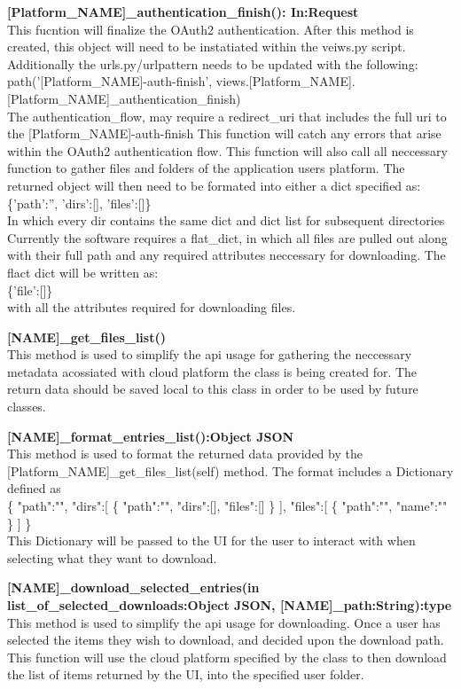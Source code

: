 \textbf{[Platform\_NAME]\_authentication\_finish(): In:Request} \\
This fucntion will finalize the OAuth2 authentication. After this method is created, this object will need to be instatiated
within the veiws.py script. Additionally the urls.py/urlpattern needs to be updated with the following: \\
  path('[Platform_NAME]-auth-finish', views.[Platform_NAME].[Platform_NAME]_authentication_finish) \\
The authentication_flow, may require a redirect_uri that includes the full uri to the [Platform_NAME]-auth-finish
This function will catch any errors that arise within the OAuth2 authentication flow. 
This function will also call all neccessary function to gather files and folders of the application users platform.
The returned object will then need to be formated into either a dict specified as: \\
  \{'path':'', 'dirs':[], 'files':[]\} \\
   In which every dir contains the same dict and dict list for subsequent directories
Currently the software requires a flat_dict, in which all files are pulled out along with their full path and any required 
attributes neccessary for downloading. The flact dict will be written as: \\
  \{'file':[]\} \\ 
with all the attributes required for downloading files.

\textbf{[NAME]\_get\_files\_list()} \\
This method is used to simplify the api usage for gathering the neccessary metadata acossiated with cloud platform the class is being created for.
The return data should be saved local to this class in order to be used by future classes. 

\textbf{[NAME]\_format\_entries\_list():Object JSON} \\
This method is used to format the returned data provided by the [Platform\_NAME]\_get\_files\_list(self) method. The format includes a Dictionary defined as 
\\
\{
   "path":"",
   "dirs":[
      \{
         "path":"",
         "dirs":[],
         "files":[]
      \}
   ],
   "files":[
      \{
         "path":"",
         "name":""
      \}
   ]
\}
\\
This Dictionary will be passed to the UI for the user to interact with when selecting what they want to download.

\textbf{[NAME]\_download\_selected\_entries(in list\_of\_selected\_downloads:Object JSON, [NAME]\_path:String):type} \\
​This method is used to simplify the api usage for downloading. Once a user has selected the items they wish to download, and decided upon the 
download path. This function will use the cloud platform specified by the class to then download the list of items returned by the UI, into the 
specified user folder.

